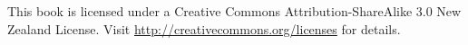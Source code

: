 
This book is licensed under a Creative
Commons Attribution-ShareAlike 3.0 New Zealand License.
Visit \url{http://creativecommons.org/licenses} for details.


